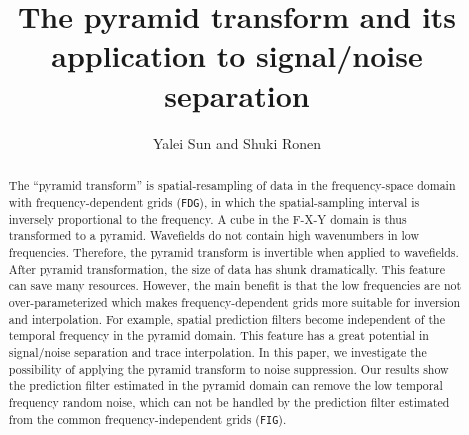 \def\figdir{./Fig}
\title{The pyramid transform and its application to signal/noise separation}
\author{Yalei Sun and Shuki Ronen}

\begin{abstract}
The ``pyramid transform'' is spatial-resampling of data in the
frequency-space domain with frequency-dependent grids ({\tt FDG}), in which
the spatial-sampling interval is inversely proportional to the frequency.
A cube in the F-X-Y domain is thus transformed to a pyramid.
Wavefields do not contain high wavenumbers in low frequencies.
Therefore, the pyramid transform is invertible when applied to wavefields.
After pyramid transformation, the size of data has shunk dramatically.
This feature can save many resources. However, the main benefit is that the low
frequencies are not over-parameterized which makes frequency-dependent
grids more suitable for inversion and interpolation.
For example, spatial prediction filters become independent of the temporal
frequency in the pyramid domain.  This feature has a great
potential in signal/noise separation and trace interpolation.
In this paper, we investigate the possibility of applying the pyramid 
transform to noise suppression. Our results
show the prediction filter estimated in the pyramid domain can remove the
low temporal frequency random noise, which can not be handled by the
prediction filter estimated from the common frequency-independent grids 
({\tt FIG}). 
\end{abstract}

  
